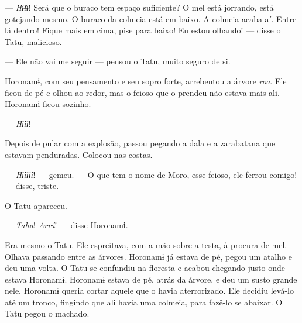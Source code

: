 --- \textit{Hɨ̃ɨɨ}! Será que o buraco tem espaço suficiente? O mel está jorrando,
está gotejando mesmo. O buraco da colmeia está em baixo. A colmeia acaba
aí. Entre lá dentro! Fique mais em cima, pise para baixo! Eu estou
olhando! --- disse o Tatu, malicioso. 


--- Ele não vai me seguir --- pensou o Tatu, muito seguro de si. 

Horonamɨ, com seu pensamento e seu sopro forte, arrebentou a
árvore \textit{roa}. Ele ficou de pé e olhou ao redor, mas o feioso que o
prendeu não estava mais ali. Horonamɨ ficou sozinho. 

--- \textit{Hɨ̃ɨɨ}! 

Depois de pular com a explosão, passou pegando a dala e a zarabatana que
estavam penduradas. Colocou nas costas. 

--- \textit{Hɨ̃ɨɨɨɨ}! --- gemeu. --- O que tem o nome de Moro, esse feioso,
ele ferrou comigo! --- disse, triste.


O Tatu apareceu.

--- \textit{Taha}! \textit{Arrá}! --- disse Horonamɨ. 

Era mesmo o Tatu. Ele espreitava, com a mão sobre a testa, à procura de
mel. Olhava passando entre as árvores. Horonamɨ já estava de pé, pegou
um atalho e deu uma volta. O Tatu se confundiu na floresta e acabou
chegando justo onde estava Horonamɨ. Horonamɨ estava de pé, atrás da
árvore, e deu um susto grande nele. Horonamɨ queria cortar aquele que o
havia aterrorizado. Ele decidiu levá-lo até um tronco, fingindo que ali
havia uma colmeia, para fazê-lo se abaixar. O Tatu pegou o machado. 

